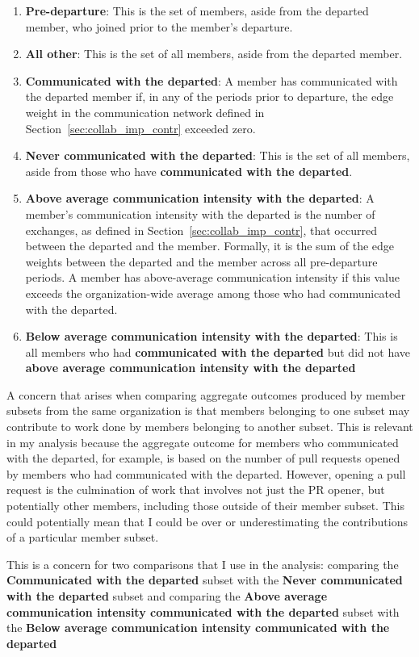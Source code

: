 \documentclass[12pt,notitlepage]{article}
\begin{document}
\begin{enumerate}
\item \textbf{Pre-departure}: This is the set of members, aside from the departed member, who joined prior to the member's departure. 
\item \textbf{All other}: This is the set of all members, aside from the departed member. 
\item \textbf{Communicated with the departed}: A member has communicated with the departed member if, in any of the periods prior to departure, the edge weight in the communication network defined in Section~\ref{sec:collab_imp_contr} exceeded zero. 
\item \textbf{Never communicated with the departed}: This is the set of all members, aside from those who have \textbf{communicated with the departed}.
\item \textbf{Above average communication intensity with the departed}: A member's communication intensity with the departed is the number of exchanges, as defined in Section~\ref{sec:collab_imp_contr}, that occurred between the departed and the member. Formally, it is the sum of the edge weights between the departed and the member across all pre-departure periods. A member has above-average communication intensity if this value exceeds the organization-wide average among those who had communicated with the departed.
\item \textbf{Below average communication intensity with the departed}: This is all members who had \textbf{communicated with the departed} but did not have \textbf{above average communication intensity with the departed}
\end{enumerate}

A concern that arises when comparing aggregate outcomes produced by member subsets from the same organization is that members belonging to one subset may contribute to work done by members belonging to another subset. This is relevant in my analysis because the aggregate outcome for members who communicated with the departed, for example, is based on the number of pull requests opened by members who had communicated with the departed. However, opening a pull request is the culmination of work that involves not just the PR opener, but potentially other members, including those outside of their member subset. This could potentially mean that I could be over or underestimating the contributions of a particular member subset. 

This is a concern for two comparisons that I use in the analysis: comparing the \textbf{Communicated with the departed} subset with the \textbf{Never communicated with the departed} subset and comparing the \textbf{Above average communication intensity communicated with the departed} subset with the \textbf{Below average communication intensity communicated with the departed}
\end{document}
